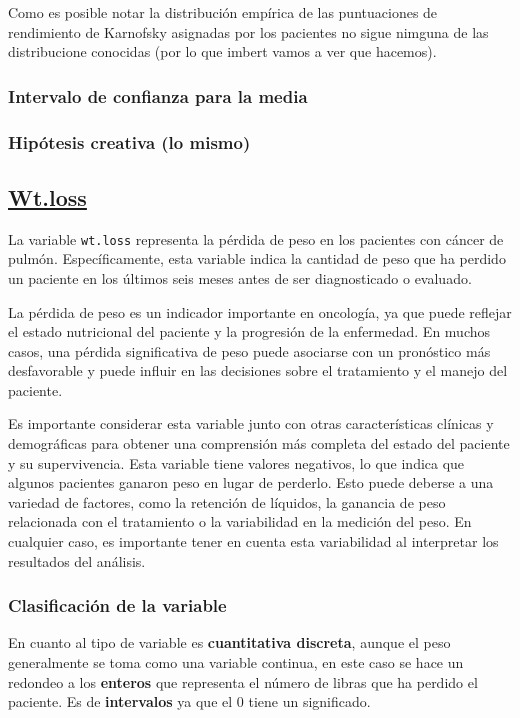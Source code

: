 \documentclass[a4paper,12pt]{article}
\begin{document}
    Como es posible notar la distribución empírica de las puntuaciones de rendimiento de Karnofsky asignadas por los pacientes no sigue nimguna de las distribucione conocidas (por lo que imbert vamos a ver que hacemos).

    \subsubsection*{Intervalo de confianza para la media}

    \subsubsection*{Hipótesis creativa (lo mismo)}


    \subsection*{\underline{Wt.loss}}

    La variable \texttt{wt.loss} representa la pérdida de peso en los pacientes con cáncer de pulmón. Específicamente, esta variable indica la cantidad de peso que ha perdido un paciente en los últimos seis meses antes de ser diagnosticado o evaluado.

La pérdida de peso es un indicador importante en oncología, ya que puede reflejar el estado nutricional del paciente y la progresión de la enfermedad. En muchos casos, una pérdida significativa de peso puede asociarse con un pronóstico más desfavorable y puede influir en las decisiones sobre el tratamiento y el manejo del paciente.

Es importante considerar esta variable junto con otras características clínicas y demográficas para obtener una comprensión más completa del estado del paciente y su supervivencia.
Esta variable tiene valores negativos, lo que indica que algunos pacientes ganaron peso en lugar de perderlo. Esto puede deberse a una variedad de factores, como la retención de líquidos, la ganancia de peso relacionada con el tratamiento o la variabilidad en la medición del peso. En cualquier caso, es importante tener en cuenta esta variabilidad al interpretar los resultados del análisis.

\subsubsection*{Clasificación de la variable}

En cuanto al tipo de variable es \textbf{cuantitativa discreta}, aunque el peso generalmente se toma como una variable continua, en este caso se hace un redondeo a los \textbf{enteros} que representa el número de libras que ha perdido el paciente. Es de \textbf{intervalos} ya que el 0 tiene un significado.
\end{document}
